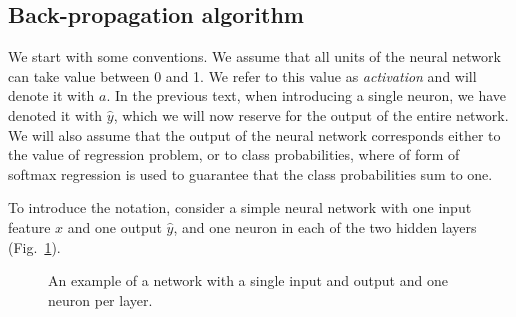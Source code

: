 \begin{refsection}
\section{Back-propagation algorithm}

We start with some conventions. We assume that all units of the neural network can take value between 0 and 1. We refer to this value as {\em activation} and will denote it with $a$. In the previous text, when introducing a single neuron, we have denoted it with $\hat{y}$, which we will now reserve for the output of the entire network. We will also assume that the output of the neural network corresponds either to the value of regression problem, or to class probabilities, where of form of softmax regression is used to guarantee that the class probabilities sum to one.

To introduce the notation, consider a simple neural network with one input feature $x$ and one output $\hat{y}$, and one neuron in each of the two hidden layers (Fig.~\ref{fig:simple-network}).

\begin{figure}[htbp]
\caption{An example of a network with a single input and output and one neuron per layer.}
\label{fig:simple-network}
\end{figure}


\end{refsection}
